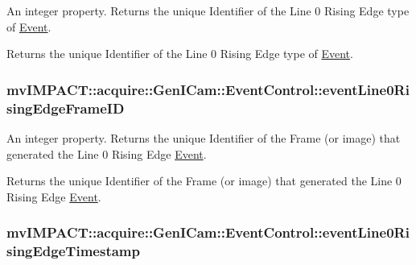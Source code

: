 An integer property. Returns the unique Identifier of the Line 0 Rising Edge type of \hyperlink{classmv_i_m_p_a_c_t_1_1acquire_1_1_event}{Event}. 

Returns the unique Identifier of the Line 0 Rising Edge type of \hyperlink{classmv_i_m_p_a_c_t_1_1acquire_1_1_event}{Event}. \hypertarget{classmv_i_m_p_a_c_t_1_1acquire_1_1_gen_i_cam_1_1_event_control_ad38c8b4956d701e964618ad08b548312}{
\subsubsection[{event\+Line0\+Rising\+Edge\+Frame\+I\+D}]{ mv\+I\+M\+P\+A\+C\+T\+::acquire\+::\+Gen\+I\+Cam\+::\+Event\+Control\+::event\+Line0\+Rising\+Edge\+Frame\+I\+D}}\label{classmv_i_m_p_a_c_t_1_1acquire_1_1_gen_i_cam_1_1_event_control_ad38c8b4956d701e964618ad08b548312}


An integer property. Returns the unique Identifier of the Frame (or image) that generated the Line 0 Rising Edge \hyperlink{classmv_i_m_p_a_c_t_1_1acquire_1_1_event}{Event}. 

Returns the unique Identifier of the Frame (or image) that generated the Line 0 Rising Edge \hyperlink{classmv_i_m_p_a_c_t_1_1acquire_1_1_event}{Event}. \hypertarget{classmv_i_m_p_a_c_t_1_1acquire_1_1_gen_i_cam_1_1_event_control_a5ac8a736d0b501397a09270699ddcb7e}{
\subsubsection[{event\+Line0\+Rising\+Edge\+Timestamp}]{ mv\+I\+M\+P\+A\+C\+T\+::acquire\+::\+Gen\+I\+Cam\+::\+Event\+Control\+::event\+Line0\+Rising\+Edge\+Timestamp}}\label{classmv_i_m_p_a_c_t_1_1acquire_1_1_gen_i_cam_1_1_event_control_a5ac8a736d0b501397a09270699ddcb7e}


